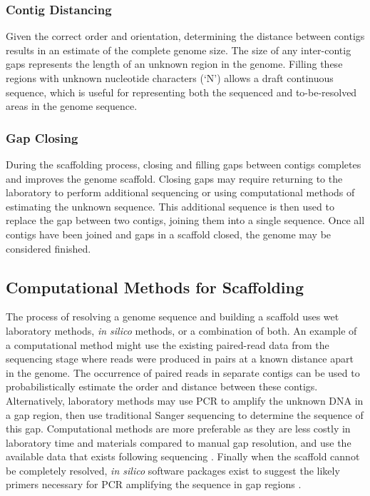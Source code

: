 \documentclass[10pt]{bmc_article}
\newenvironment{bmcformat}{\begin{raggedright}\baselineskip20pt\sloppy\setboolean{publ}{false}}{\end{raggedright}\baselineskip20pt\sloppy}
\begin{document}
\begin{bmcformat}
\subsubsection*{Contig Distancing} %

Given the correct order and orientation, determining the distance between
contigs results in an estimate of the complete genome size. The size of any
inter-contig gaps represents the length of an unknown region in the genome.
Filling these regions with unknown nucleotide characters (`N') allows a draft
continuous sequence, which is useful for representing both the sequenced and
to-be-resolved areas in the genome sequence.

\subsubsection*{Gap Closing} %

During the scaffolding process, closing and filling gaps between contigs
completes and improves the genome scaffold. Closing gaps may require returning
to the laboratory to perform additional sequencing or using computational
methods of estimating the unknown sequence. This additional sequence is then
used to replace the gap between two contigs, joining them into a single
sequence. Once all contigs have been joined and gaps in a scaffold closed, the
genome may be considered finished.

\subsection*{Computational Methods for Scaffolding} %

The process of resolving a genome sequence and building a scaffold uses wet
laboratory methods, \emph{in silico} methods, or a combination of both. An
example of a computational method might use the existing paired-read data from
the sequencing stage where reads were produced in pairs at a known distance
apart in the genome. The occurrence of paired reads in separate contigs can be
used to probabilistically estimate the order and distance between these
contigs. Alternatively, laboratory methods may use PCR to amplify the unknown
DNA in a gap region, then use traditional Sanger sequencing to determine the
sequence of this gap. Computational methods are more preferable as they are
less costly in laboratory time and materials compared to manual gap resolution,
and use the available data that exists following sequencing
\cite{nagarajan2010}. Finally when the scaffold cannot be completely resolved,
\emph{in silico} software packages exist to suggest the likely primers
necessary for PCR amplifying the sequence in gap regions \cite{gordon2001}. \pb


\end{bmcformat}
\end{document}

